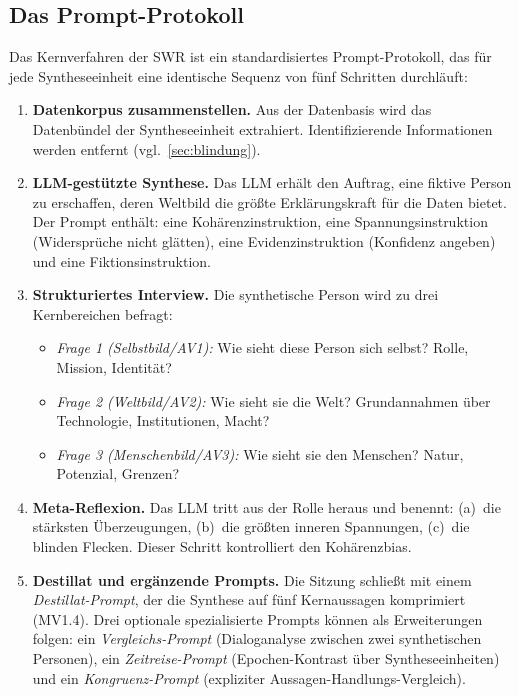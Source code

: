 \documentclass[11pt,a4paper]{article}
\theoremstyle{definition}
\theoremstyle{plain}
\theoremstyle{remark}
\begin{document}
\subsection{Das Prompt-Protokoll}
\label{sec:prompt}

Das Kernverfahren der SWR ist ein standardisiertes Prompt-Protokoll, das f\"ur jede Syntheseeinheit eine identische Sequenz von f\"unf Schritten durchl\"auft:\label{sec:promptprotokoll}

\begin{enumerate}[leftmargin=*]
  \item \textbf{Datenkorpus zusammenstellen.} Aus der Datenbasis wird das Datenb\"undel der Syntheseeinheit extrahiert. Identifizierende Informationen werden entfernt (vgl.\ \ref{sec:blindung}).

  \item \textbf{LLM-gest\"utzte Synthese.} Das LLM erh\"alt den Auftrag, eine fiktive Person zu erschaffen, deren Weltbild die gr\"o\ss{}te Erkl\"arungskraft f\"ur die Daten bietet. Der Prompt enth\"alt: eine Koh\"arenzinstruktion, eine Spannungsinstruktion (Widerspr\"uche nicht gl\"atten), eine Evidenzinstruktion (Konfidenz angeben) und eine Fiktionsinstruktion.

  \item \textbf{Strukturiertes Interview.} Die synthetische Person wird zu drei Kernbereichen befragt:
  \begin{itemize}[leftmargin=*]
    \item \emph{Frage 1 (Selbstbild/AV1):} Wie sieht diese Person sich selbst? Rolle, Mission, Identit\"at?
    \item \emph{Frage 2 (Weltbild/AV2):} Wie sieht sie die Welt? Grundannahmen \"uber Technologie, Institutionen, Macht?
    \item \emph{Frage 3 (Menschenbild/AV3):} Wie sieht sie den Menschen? Natur, Potenzial, Grenzen?
  \end{itemize}

  \item \textbf{Meta-Reflexion.} Das LLM tritt aus der Rolle heraus und benennt: (a)~die st\"arksten \"Uberzeugungen, (b)~die gr\"o\ss{}ten inneren Spannungen, (c)~die blinden Flecken. Dieser Schritt kontrolliert den Koh\"arenzbias.

  \item \textbf{Destillat und erg\"anzende Prompts.} Die Sitzung schlie\ss{}t mit einem \emph{Destillat-Prompt}, der die Synthese auf f\"unf Kernaussagen komprimiert (MV1.4). Drei optionale spezialisierte Prompts k\"onnen als Erweiterungen folgen: ein \emph{Vergleichs-Prompt} (Dialoganalyse zwischen zwei synthetischen Personen), ein \emph{Zeitreise-Prompt} (Epochen-Kontrast \"uber Syntheseeinheiten) und ein \emph{Kongruenz-Prompt} (expliziter Aussagen-Handlungs-Vergleich).
\end{enumerate}
\end{document}
